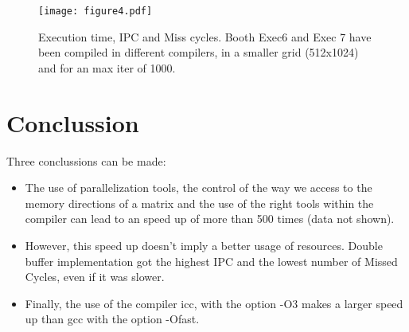 \documentclass{article}
\begin{document}
	\begin{figure}
		\centering
		\texttt{[image: figure4.pdf]}
		\caption {Execution time, IPC and Miss cycles. Booth
		Exec6 and Exec 7 have been compiled in different
		compilers, in a smaller grid (512x1024) and for an
		max iter of 1000.}
		\label{fig:Plot4}
	\end{figure}

	
\section{Conclussion}

	Three conclussions can be made:

	\begin{itemize}
		\item The use of parallelization tools, the control
		of the way we access to the memory directions of a matrix
		and the use of the right tools within the compiler can
		lead to an speed up of more than 500 times (data not
		shown).
		\item However, this speed up doesn't imply a better
		usage of resources. Double buffer implementation
		got the highest IPC and the lowest number of Missed
		Cycles, even if it was slower.
		\item Finally, the use of the compiler icc, with
		the option -O3 makes a larger speed up than gcc
		with the option -Ofast.
	\end{itemize}
\end{document}
